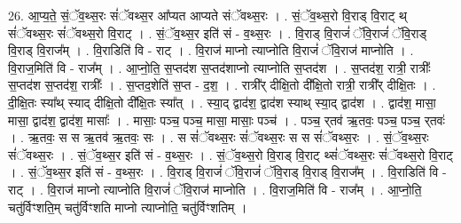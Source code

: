 \documentclass[17pt]{extarticle}
\begin{document}
26. आ॒प्य॒ते॒ सं॒ॅव॒थ्स॒रः सं॑ॅवथ्स॒र आ᳚प्यत आप्यते संॅवथ्स॒रः । . सं॒ॅव॒थ्स॒रो वि॒राड् वि॒राट् थ् सं॑ॅवथ्स॒रः सं॑ॅवथ्स॒रो वि॒राट् । . सं॒ॅव॒थ्स॒र इति॑ सं - व॒थ्स॒रः । . वि॒राड् वि॒राजं॑ ॅवि॒राजं॑ ॅवि॒राड् वि॒राड् वि॒राज᳚म् । . वि॒राडिति॑ वि - राट् । . वि॒राज॑ माप्नो त्याप्नोति वि॒राजं॑ ॅवि॒राज॑ माप्नोति । . वि॒राज॒मिति॑ वि - राज᳚म् । . आ॒प्नो॒ति॒ स॒प्तद॑श स॒प्तद॑शाप्नो त्याप्नोति स॒प्तद॑श । . स॒प्तद॑श॒ रात्री॒ रात्रीः᳚ स॒प्तद॑श स॒प्तद॑श॒ रात्रीः᳚ । . स॒प्तद॒शेति॑ स॒प्त - द॒श॒ । . रात्री᳚र् दीक्षि॒तो दी᳚क्षि॒तो रात्री॒ रात्री᳚र् दीक्षि॒तः । . दी॒क्षि॒तः स्या᳚थ् स्याद् दीक्षि॒तो दी᳚क्षि॒तः स्या᳚त् । . स्या॒द् द्वाद॑श॒ द्वाद॑श स्याथ् स्या॒द् द्वाद॑श । . द्वाद॑श॒ मासा॒ मासा॒ द्वाद॑श॒ द्वाद॑श॒ मासाः᳚ । . मासाः॒ पञ्च॒ पञ्च॒ मासा॒ मासाः॒ पञ्च॑ । . पञ्च॒ र्‌तव॑ ऋ॒तवः॒ पञ्च॒ पञ्च॒ र्‌तवः॑ । . ऋ॒तवः॒ स स ऋ॒तव॑ ऋ॒तवः॒ सः । . स सं॑ॅवथ्स॒रः सं॑ॅवथ्स॒रः स स सं॑ॅवथ्स॒रः । . सं॒ॅव॒थ्स॒रः सं॑ॅवथ्स॒रः । . सं॒ॅव॒थ्स॒र इति॑ सं - व॒थ्स॒रः । . सं॒ॅव॒थ्स॒रो वि॒राड् वि॒राट् थ्सं॑ॅवथ्स॒रः सं॑ॅवथ्स॒रो वि॒राट् । . सं॒ॅव॒थ्स॒र इति॑ सं - व॒थ्स॒रः । . वि॒राड् वि॒राजं॑ ॅवि॒राजं॑ ॅवि॒राड् वि॒राड् वि॒राज᳚म् । . वि॒राडिति॑ वि - राट् । . वि॒राज॑ माप्नो त्याप्नोति वि॒राजं॑ ॅवि॒राज॑ माप्नोति । . वि॒राज॒मिति॑ वि - राज᳚म् । . आ॒प्नो॒ति॒ चतु॑र्विꣳशति॒म् चतु॑र्विꣳशति माप्नो त्याप्नोति॒ चतु॑र्विꣳशतिम् । \newline
\end{document}
